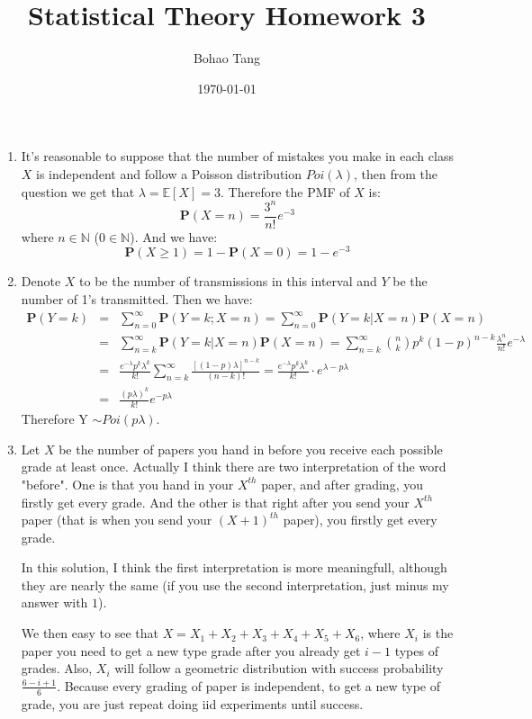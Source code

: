 \documentclass[12pt]{article}
\title{Statistical Theory Homework 3}
\date{\today}
\author{Bohao Tang}
\newcommand{\prob}[1]{\textbf{P}(#1)}
\begin{document}

\maketitle

\begin{enumerate}
    \item
    It's reasonable to suppose that the number of mistakes you make in each class $X$ is independent and follow a Poisson distribution
    $Poi(\lambda)$, then from the question we get that $\lambda = \mathbb{E}[X] = 3$. Therefore the PMF of $X$ is:
    $$\textbf{P}(X = n) = \frac{3^n}{n !} e^{-3}$$
    where $n \in \mathbb{N}$ ($0 \in \mathbb{N}$). And we have:
    $$\textbf{P}(X \ge 1) = 1 - \textbf{P}(X = 0) = 1 - e^{-3}$$
    \item
    Denote $X$ to be the number of transmissions in this interval and $Y$ be the number of 1's transmitted.
    Then we have:
    \begin{eqnarray}
        \prob{Y = k} &=& \sum_{n=0}^{\infty} \prob{Y = k; X = n} = \sum_{n=0}^{\infty} \prob{Y = k | X = n} \prob{X = n} \\
                     &=& \sum_{n=k}^{\infty} \prob{Y = k | X = n} \prob{X = n} = \sum_{n=k}^{\infty} \binom{n}{k} p^k (1-p)^{n-k} \frac{\lambda^n}{n !} e^{-\lambda} \\
                     &=& \frac{e^{-\lambda} p^k \lambda^k}{k !} \sum_{n=k}^{\infty}\frac{[(1-p)\lambda]^{n-k}}{(n-k)!} = \frac{e^{-\lambda} p^k \lambda^k}{k !} \cdot e^{\lambda - p\lambda} \\
                     &=& \frac{(p\lambda)^k}{k !} e^{-p\lambda}
    \end{eqnarray}
    Therefore Y $\sim Poi(p\lambda)$.
    \item
    Let $X$ be the number of papers you hand in before you receive each possible grade at least once. 
    Actually I think there are two interpretation of the word "before". One is that you hand in your $X^{th}$ paper, and after grading, you firstly get every grade.
    And the other is that right after you send your $X^{th}$ paper (that is when you send your $(X+1)^{th}$ paper), you firstly get every grade.
    
    In this solution, I think the first interpretation is more meaningfull, although they are nearly the same (if you use the second interpretation, just minus my answer with $1$).

    We then easy to see that $X = X_1 + X_2 + X_3 + X_4 + X_5 + X_6$, where $X_i$ is the paper you need to get a new type grade after you already get $i - 1$ types of grades.
    Also, $X_i$ will follow a geometric distribution with success probability $\frac{6-i+1}{6}$. Because every grading of paper is independent, to get a new type of grade, you are just repeat doing iid experiments until success.
    

\end{enumerate}
\end{document}
